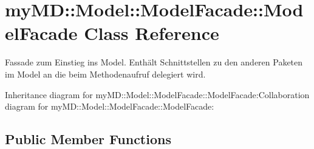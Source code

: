 \hypertarget{classmy_m_d_1_1_model_1_1_model_facade_1_1_model_facade}{
\section{my\-MD::Model::Model\-Facade::Model\-Facade Class Reference}
\label{d5/dc0/classmy_m_d_1_1_model_1_1_model_facade_1_1_model_facade}
}
Fassade zum Einstieg ins Model. Enth\"{a}lt Schnittstellen zu den anderen Paketen im Model an die beim Methodenaufruf delegiert wird.  


Inheritance diagram for my\-MD::Model::Model\-Facade::Model\-Facade:Collaboration diagram for my\-MD::Model::Model\-Facade::Model\-Facade:\subsection*{Public Member Functions}
